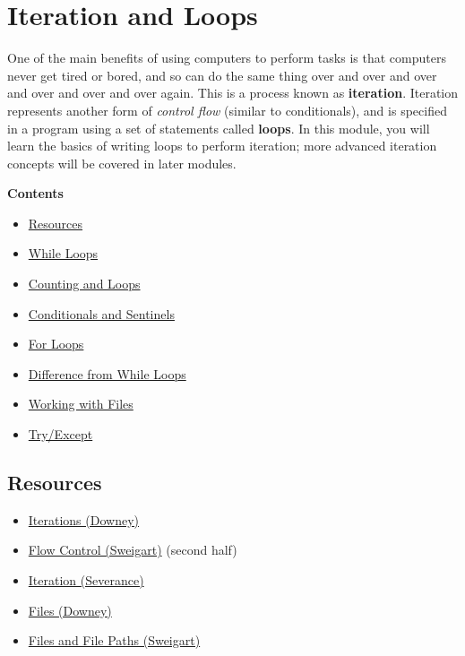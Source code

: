 \documentclass[]{book}
\providecommand{\tightlist}{%
  \setlength{\itemsep}{0pt}\setlength{\parskip}{0pt}}
\begin{document}
\chapter{Iteration and Loops}\label{iteration-and-loops}

One of the main benefits of using computers to perform tasks is that
computers never get tired or bored, and so can do the same thing over
and over and over and over and over and over again. This is a process
known as \textbf{iteration}. Iteration represents another form of
\emph{control flow} (similar to conditionals), and is specified in a
program using a set of statements called \textbf{loops}. In this module,
you will learn the basics of writing loops to perform iteration; more
advanced iteration concepts will be covered in later modules.

\textbf{Contents}

\begin{itemize}
\tightlist
\item
  \protect\hyperlink{resources}{Resources}
\item
  \protect\hyperlink{while-loops}{While Loops}
\item
  \protect\hyperlink{counting-and-loops}{Counting and Loops}
\item
  \protect\hyperlink{conditionals-and-sentinels}{Conditionals and
  Sentinels}
\item
  \protect\hyperlink{for-loops}{For Loops}
\item
  \protect\hyperlink{difference-from-while-loops}{Difference from While
  Loops}
\item
  \protect\hyperlink{working-with-files}{Working with Files}
\item
  \protect\hyperlink{tryexcept}{Try/Except}
\end{itemize}

\section{Resources}\label{resources-2}

\begin{itemize}
\tightlist
\item
  \href{https://books.trinket.io/pfe/05-iterations.html}{Iterations
  (Downey)}
\item
  \href{https://automatetheboringstuff.com/chapter2/}{Flow Control
  (Sweigart)} (second half)
\item
  \href{http://openbookproject.net/thinkcs/python/english3e/iteration.html}{Iteration
  (Severance)}
\item
  \href{https://books.trinket.io/pfe/07-files.html}{Files (Downey)}
\item
  \href{https://automatetheboringstuff.com/chapter8/}{Files and File
  Paths (Sweigart)}
\end{itemize}
\end{document}
